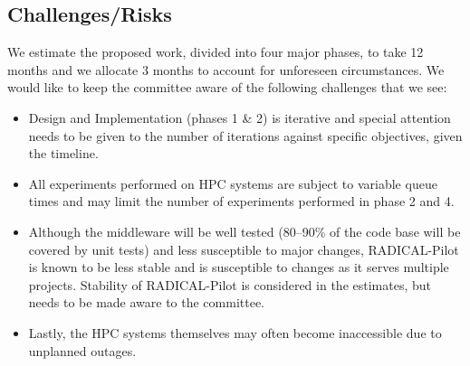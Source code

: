 \subsection{Challenges/Risks}

We estimate the proposed work, divided into four major phases, to take 12 months 
and we allocate 3 months to account for unforeseen circumstances. We would like 
to keep the committee aware of the following challenges that we see:

\begin{itemize}
	\item Design and Implementation (phases 1 \& 2) is iterative and special attention 
	needs to be given to the number of iterations against specific objectives, 
	given the timeline.
  \item All experiments performed on HPC systems are subject to variable queue 
	times and may limit the number of experiments performed in phase 2 and 4.
	\item Although the middleware will be well tested (80--90\% of the code base 
	will be covered by unit tests) and less susceptible to major changes, RADICAL-Pilot 
	is known to be less stable and is susceptible to changes as it serves multiple 
	projects. Stability of RADICAL-Pilot is considered in the estimates, but needs 
	to be made aware to the committee.
	\item Lastly, the HPC systems themselves may often become inaccessible due to 
	unplanned outages.
\end{itemize}



\textit{}
